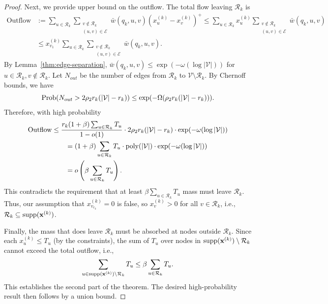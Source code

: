 \documentclass{article} %
\begin{document}
\begin{proof}
Next, we provide upper bound on the outflow. The total flow leaving $\mathcal{R}_k$ is
\begin{align}
\nonumber
    \text{Outflow} &:= \sum_{u \in \mathcal{R}_k} \sum_{\substack{v \notin \mathcal{R}_k \\ (u,v) \in \mathcal{E}}} \bar{w}(q_k, u, v)(x_u^{(k)} - x_v^{(k)})^+ \leq \sum_{u \in \mathcal{R}_k} x_u^{(k)} \sum_{\substack{v \notin \mathcal{R}_k \\ (u,v) \in \mathcal{E}}} \bar{w}(q_k, u, v)\\
    &\leq x_{v_1}^{(k)} \sum_{u \in \mathcal{R}_k} \sum_{\substack{v \notin \mathcal{R}_k \\ (u,v) \in \mathcal{E}}} \bar{w}(q_k, u, v).
\end{align}
By Lemma~\ref{thm:edge-separation}, $\bar{w}(q_k, u, v) \leq \exp(-\omega(\log|\mathcal{V}|))$ for $u \in \mathcal{R}_k, v \notin \mathcal{R}_k$.
Let $N_{out}$ be the number of edges from $\mathcal{R}_k$ to $\mathcal{V} \setminus \mathcal{R}_k$. By Chernoff bounds, we have 
\begin{equation}
    \textnormal{Prob}(N_{out} > 2\rho_2 r_k(|\mathcal{V}|-r_k)) \leq \exp(-\Omega(\rho_2 r_k(|\mathcal{V}|-r_k))).
\end{equation}
Therefore, with high probability
\begin{align*}
    \textnormal{Outflow} &\leq \frac{r_k(1+\beta)\sum_{u \in \mathcal{R}_k} T_u}{1 - o(1)} \cdot 2\rho_2 r_k(|\mathcal{V}|-r_k) \cdot \exp(-\omega(\log|\mathcal{V}|))\\
    &\qquad= (1+\beta)\sum_{u \in \mathcal{R}_k} T_u \cdot \textnormal{poly}(|\mathcal{V}|) \cdot \exp(-\omega(\log|\mathcal{V}|))\\
    &\qquad= o\left(\beta\sum_{u \in \mathcal{R}_k} T_u\right).
\end{align*}
This contradicts the requirement that at least $\beta\sum_{u \in \mathcal{R}_k} T_u$ mass must leave $\mathcal{R}_k$. Thus, our assumption that $x_{v_{r_k}}^{(k)} = 0$ is false, so $x_{v}^{(k)} > 0$ for all $v \in \mathcal{R}_k$, i.e., $\mathcal{R}_k \subseteq \textnormal{supp}(\mathbf{x}^{(k)})$.

Finally, the mass that does leave $\mathcal{R}_k$ must be absorbed at nodes outside $\mathcal{R}_k$. Since each $x_u^{(k)} \leq T_u$ (by the constraints), the sum of $T_u$ over nodes in $\textnormal{supp}(\mathbf{x}^{(k)}) \setminus \mathcal{R}_k$ cannot exceed the total outflow, i.e.,
\begin{equation*}
    \sum_{u \in \textnormal{supp}(\mathbf{x}^{(k)}) \setminus \mathcal{R}_k} T_u \leq \beta \sum_{u \in \mathcal{R}_k} T_u.
\end{equation*}
This establishes the second part of the theorem. The desired high-probability result then follows by a union bound.
\end{proof}
\end{document}
